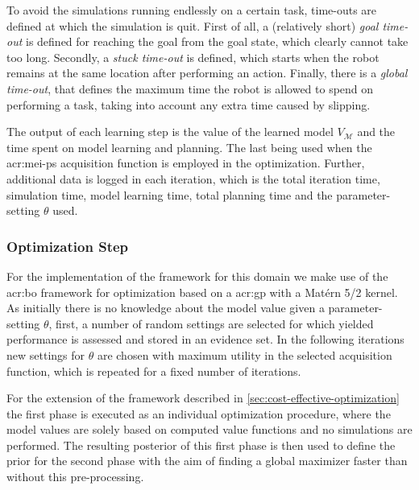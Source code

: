 To avoid the simulations running endlessly on a certain task, time-outs are defined at which the simulation is quit.
First of all, a (relatively short) \textit{goal time-out} is defined for reaching the goal from the goal state, which clearly cannot take too long.
Secondly, a \textit{stuck time-out} is defined, which starts when the robot remains at the same location after performing an action.
Finally, there is a \textit{global time-out}, that defines the maximum time the robot is allowed to spend on performing a task, taking into account any extra time caused by slipping.

The output of each learning step is the value of the learned model $V_\mathcal{M}$ and the time spent on model learning and planning.
The last being used when the \acrshort{acr:mei-ps} acquisition function is employed in the optimization.
Further, additional data is logged in each iteration, which is the total iteration time, simulation time, model learning time, total planning time and the parameter-setting $\theta$ used.


\subsubsection{Optimization Step}
\label{sec:optimization-step-robot}

For the implementation of the framework for this domain we make use of the \acrshort{acr:bo} framework for optimization based on a \acrshort{acr:gp} with a Mat\'ern 5/2 kernel.
As initially there is no knowledge about the model value given a parameter-setting $\theta$, first, a number of random settings are selected for which yielded performance is assessed and stored in an evidence set.
In the following iterations new settings for $\theta$ are chosen with maximum utility in the selected acquisition function, which is repeated for a fixed number of iterations.

For the extension of the framework described in \autoref{sec:cost-effective-optimization} the first phase is executed as an individual optimization procedure, where the model values are solely based on computed value functions and no simulations are performed.
The resulting posterior of this first phase is then used to define the prior for the second phase with the aim of finding a global maximizer faster than without this pre-processing.

